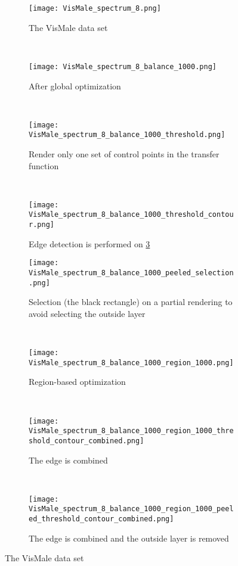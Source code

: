 \begin{figure}
	\centering
	\begin{subfigure}[b]{0.24\textwidth}
		\centering
		\texttt{[image: VisMale\_spectrum\_8.png]}
		\caption{The VisMale data set}
		\label{fig:VisMale_spectrum_8}
	\end{subfigure}~
	\begin{subfigure}[b]{0.24\textwidth}
		\centering
		\texttt{[image: VisMale\_spectrum\_8\_balance\_1000.png]}
		\caption{After global optimization}
		\label{fig:VisMale_spectrum_8_balance_1000}
	\end{subfigure}~
	\begin{subfigure}[b]{0.24\textwidth}
		\centering
		\texttt{[image: VisMale\_spectrum\_8\_balance\_1000\_threshold.png]}
		\caption{Render only one set of control points in the transfer function}
		\label{fig:VisMale_spectrum_8_balance_1000_threshold}
	\end{subfigure}~
	\begin{subfigure}[b]{0.24\textwidth}
		\centering
		\texttt{[image: VisMale\_spectrum\_8\_balance\_1000\_threshold\_contour.png]}
		\caption{Edge detection is performed on \ref{fig:VisMale_spectrum_8_balance_1000_threshold}}
		\label{fig:VisMale_spectrum_8_balance_1000_threshold_contour}
	\end{subfigure}
	\begin{subfigure}[b]{0.24\textwidth}
		\centering
		\texttt{[image: VisMale\_spectrum\_8\_balance\_1000\_peeled\_selection.png]}
		\caption{Selection (the black rectangle) on a partial rendering to avoid selecting the outside layer}
		\label{fig:VisMale_spectrum_8_balance_1000_peeled_selection}
	\end{subfigure}~
	\begin{subfigure}[b]{0.24\textwidth}
		\centering
		\texttt{[image: VisMale\_spectrum\_8\_balance\_1000\_region\_1000.png]}
		\caption{Region-based optimization}
		\label{fig:VisMale_spectrum_8_balance_1000_region_1000}
	\end{subfigure}~
	\begin{subfigure}[b]{0.24\textwidth}
		\centering
		\texttt{[image: VisMale\_spectrum\_8\_balance\_1000\_region\_1000\_threshold\_contour\_combined.png]}
		\caption{The edge is combined}
		\label{fig:VisMale_spectrum_8_balance_1000_region_1000_threshold_contour_combined}
	\end{subfigure}~
	\begin{subfigure}[b]{0.24\textwidth}
		\centering
		\texttt{[image: VisMale\_spectrum\_8\_balance\_1000\_region\_1000\_peeled\_threshold\_contour\_combined.png]}
		\caption{The edge is combined and the outside layer is removed}
		\label{fig:VisMale_spectrum_8_balance_1000_region_1000_peeled_threshold_contour_combined}
	\end{subfigure}
	\caption{The VisMale data set}\label{fig:multiple_VisMale_spectrum_4_balance_1000_threshold_contour}
\end{figure}

